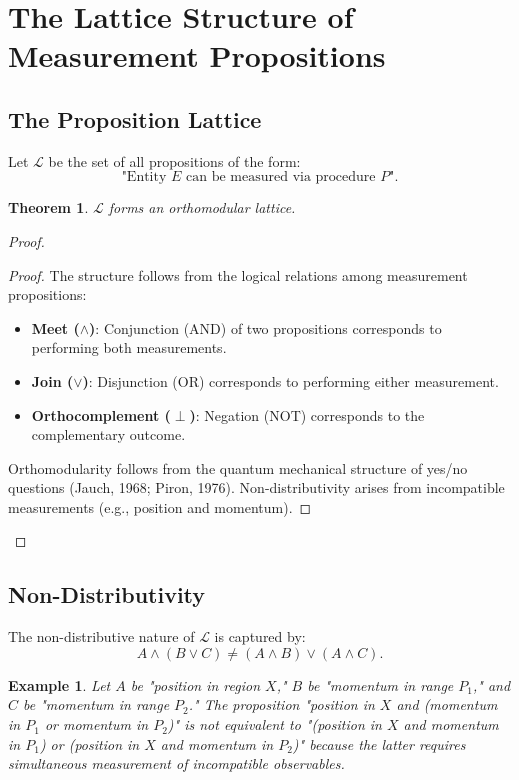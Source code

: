 \documentclass[aps,preprint,showpacs,showkeys]{revtex4}
\newtheorem{theorem}{Theorem}
\newtheorem{example}{Example}
\begin{document}
\section{The Lattice Structure of Measurement Propositions}

\subsection{The Proposition Lattice}

Let $\mathcal{L}$ be the set of all propositions of the form: 
\begin{equation}
\text{"Entity } E \text{ can be measured via procedure } P\text{"}.
\end{equation}

\begin{theorem}
$\mathcal{L}$ forms an orthomodular lattice.
\end{theorem}

\begin{proof}
\begin{proof}
The structure follows from the logical relations among measurement propositions:
\begin{itemize}
    \item \textbf{Meet ($\wedge$)}: Conjunction (AND) of two propositions corresponds to performing both measurements.
    \item \textbf{Join ($\vee$)}: Disjunction (OR) corresponds to performing either measurement.
    \item \textbf{Orthocomplement ($\perp$)}: Negation (NOT) corresponds to the complementary outcome.
\end{itemize}
Orthomodularity follows from the quantum mechanical structure of yes/no questions (Jauch, 1968; Piron, 1976). Non-distributivity arises from incompatible measurements (e.g., position and momentum).
\end{proof}
\end{proof}

\subsection{Non-Distributivity}

The non-distributive nature of $\mathcal{L}$ is captured by: 
\begin{equation}
A \wedge (B \vee C) \neq (A \wedge B) \vee (A \wedge C).
\end{equation}

\begin{example}
Let $A$ be "position in region $X$," $B$ be "momentum in range $P_1$," and $%
C $ be "momentum in range $P_2$." The proposition "position in $X$ and
(momentum in $P_1$ or momentum in $P_2$)" is not equivalent to "(position in 
$X$ and momentum in $P_1$) or (position in $X$ and momentum in $P_2$)"
because the latter requires simultaneous measurement of incompatible
observables.
\end{example}
\end{document}
